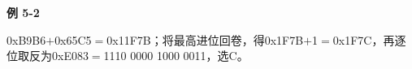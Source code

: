 {\color{ink}\bfseries 例 5-2}\par\vspace{1bp}0xB9B6\(+\allowbreak{}\)0x65C5\(=\allowbreak{}\)0x11F7B；将最高进位回卷，得0x1F7B\(+\allowbreak{}\)1\(=\allowbreak{}\)0x1F7C，再逐位取反为0xE083\(=\allowbreak{}\)1110 0000 1000 0011，选C。
